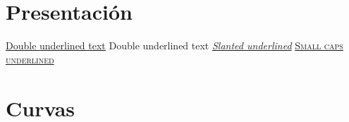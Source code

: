 \documentclass[a4paper]{book}
\begin{document}
\renewcommand\listtablename{Lista de tablas}
\listoftables
\newpage

\clearpage

\chapter*{Presentación}

\underline{\underline{Double underlined text}}
{Double underlined text}
\textsl{\underline{Slanted underlined}}
\textsc{\underline{Small caps underlined}}












\chapter{Curvas}
\setcounter{page}{1}
\end{document}
